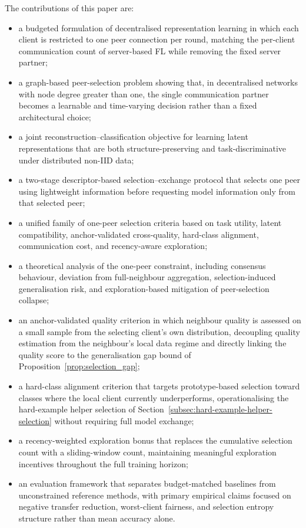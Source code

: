 \documentclass[conference]{IEEEtran}
\begin{document}
The contributions of this paper are:
\begin{itemize}
    \item a budgeted formulation of decentralised representation learning in which each client is restricted to one peer connection per round, matching the per-client communication count of server-based FL while removing the fixed server partner;

    \item a graph-based peer-selection problem showing that, in decentralised networks with node degree greater than one, the single communication partner becomes a learnable and time-varying decision rather than a fixed architectural choice;

    \item a joint reconstruction--classification objective for learning latent representations that are both structure-preserving and task-discriminative under distributed non-IID data;

    \item a two-stage descriptor-based selection--exchange protocol that selects one peer using lightweight information before requesting model information only from that selected peer;

    \item a unified family of one-peer selection criteria based on task utility, latent compatibility, anchor-validated cross-quality, hard-class alignment, communication cost, and recency-aware exploration;

    \item a theoretical analysis of the one-peer constraint, including consensus behaviour, deviation from full-neighbour aggregation, selection-induced generalisation risk, and exploration-based mitigation of peer-selection collapse;

    \item an anchor-validated quality criterion in which neighbour quality is assessed on a small sample from the selecting client's own distribution, decoupling quality estimation from the neighbour's local data regime and directly linking the quality score to the generalisation gap bound of Proposition~\ref{prop:selection_gap};

    \item a hard-class alignment criterion that targets prototype-based selection toward classes where the local client currently underperforms, operationalising the hard-example helper selection of Section~\ref{subsec:hard-example-helper-selection} without requiring full model exchange;

    \item a recency-weighted exploration bonus that replaces the cumulative selection count with a sliding-window count, maintaining meaningful exploration incentives throughout the full training horizon;

    \item an evaluation framework that separates budget-matched baselines from unconstrained reference methods, with primary empirical claims focused on negative transfer reduction, worst-client fairness, and selection entropy structure rather than mean accuracy alone.
\end{itemize}
\end{document}
